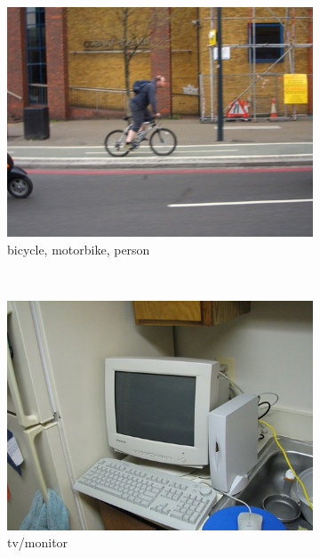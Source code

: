 \begin{figure}[bt]
\begin{subfigure}[b]{0.18\textwidth}
        \includegraphics[width=\textwidth]{000038}
        \caption{\scriptsize bicycle, motorbike, person}
        \label{fig:voc10}
    \end{subfigure}
    ~
    \begin{subfigure}[b]{0.18\textwidth}
        \centering
        \includegraphics[width=\textwidth]{000039}
        \caption{\scriptsize tv/monitor}
        \label{fig:voc15}
    \end{subfigure}
    ~
    \begin{subfigure}[b]{0.18\textwidth}
        \centering

\end{subfigure}
\end{figure}
